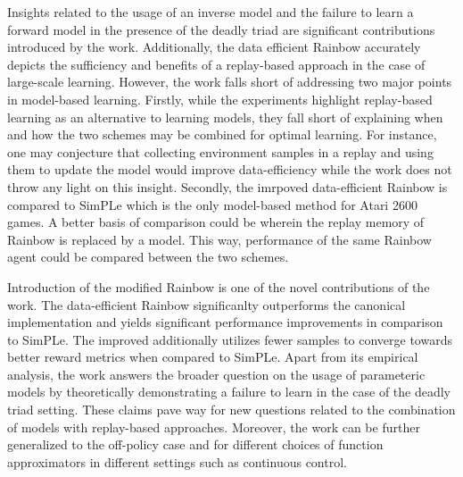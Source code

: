 \documentclass[10pt,letterpaper]{article}
\begin{document}
Insights related to the usage of an inverse model and the failure to learn a forward model in the presence of the deadly triad are significant contributions introduced by the work. Additionally, the data efficient Rainbow accurately depicts the sufficiency and benefits of a replay-based approach in the case of large-scale learning. However, the work falls short of addressing two major points in model-based learning. Firstly, while the experiments highlight replay-based learning as an alternative to learning models, they fall short of explaining when and how the two schemes may be combined for optimal learning. For instance, one may conjecture that collecting environment samples in a replay and using them to update the model would improve data-efficiency while the work does not throw any light on this insight. Secondly, the imrpoved data-efficient Rainbow is compared to SimPLe which is the only model-based method for Atari 2600 games. A better basis of comparison could be wherein the replay memory of Rainbow is replaced by a model. This way, performance of the same Rainbow agent could be compared between the two schemes. 

Introduction of the modified Rainbow is one of the novel contributions of the work. The data-efficient Rainbow significanlty outperforms the canonical implementation and yields significant performance improvements in comparison to SimPLe. The improved additionally utilizes fewer samples to converge towards better reward metrics when compared to SimPLe. Apart from its empirical analysis, the work answers the broader question on the usage of parameteric models by theoretically demonstrating a failure to learn in the case of the deadly triad setting. These claims pave way for new questions related to the combination of models with replay-based approaches. Moreover, the work can be further generalized to the off-policy case and for different choices of function approximators in different settings such as continuous control. 
\end{document}
